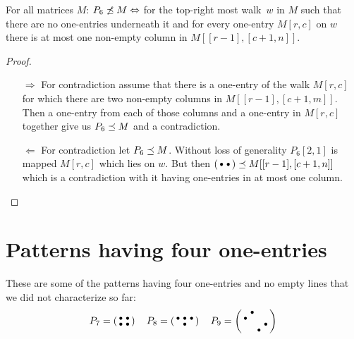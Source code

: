 \begin{prop}
For all matrices $M$: $P_6\not\preceq M\Leftrightarrow$ for the top-right most walk~$w$ in $M$ such that there are no one-entries underneath it and for every one-entry $M[r,c]$ on $w$ there is at most one non-empty column in $M[[r-1],[c+1,n]]$.
\end{prop}
\begin{proof}
\begin{itemize}
	\item[$\Rightarrow$] For contradiction assume that there is a one-entry of the walk $M[r,c]$ for which there are two non-empty columns in $M[[r-1],[c+1,m]]$. Then a one-entry from each of those columns and a one-entry in $M[r,c]$ together give us $P_6\preceq M$ and a contradiction. 
	\item[$\Leftarrow$] For contradiction let $P_6\preceq M$. Without loss of generality $P_6[2,1]$ is mapped $M[r,c]$ which lies on $w$. But then $\left(\begin{smallmatrix}\bullet&\bullet\end{smallmatrix}\right)\preceq M[[r-1],[c+1,n]]$ which is a contradiction with it having one-entries in at most one column.
\end{itemize}
\end{proof}

\section{Patterns having four one-entries}
\label{sec:4ones}
These are some of the patterns having four one-entries and no empty lines that we did not characterize so far:
$$P_7=\smm{\bullet&\bullet\\\bullet&\bullet}\ \ \ P_8=\smm{\bullet&\bullet&\bullet\\ &\bullet& }\ \ \ P_9=\smm{ &\bullet& & \\\bullet& & & \\ & & &\bullet\\ & &\bullet& }$$

